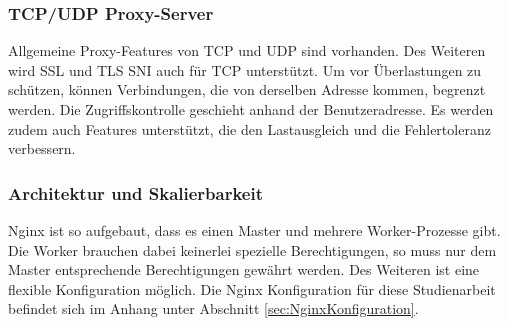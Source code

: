 \subsubsection{TCP/UDP Proxy-Server}
\label{sec:NginxTCP/UDP Proxy-Server}
Allgemeine Proxy-Features von TCP und UDP sind vorhanden. Des Weiteren wird SSL und TLS SNI auch für TCP unterstützt.
Um vor Überlastungen zu schützen, können Verbindungen, die von derselben Adresse kommen, begrenzt werden. Die Zugriffskontrolle geschieht anhand der Benutzeradresse. Es werden zudem auch Features unterstützt, die den Lastausgleich und die Fehlertoleranz verbessern.


\subsubsection{Architektur und Skalierbarkeit}
\label{sec:NginxArchitektur und Skalierbarkeit}
Nginx ist so aufgebaut, dass es einen Master und mehrere Worker-Prozesse gibt. Die Worker brauchen dabei keinerlei spezielle Berechtigungen, so muss nur dem Master entsprechende Berechtigungen gewährt werden. Des Weiteren ist eine flexible Konfiguration möglich. Die Nginx Konfiguration für diese Studienarbeit befindet sich im Anhang unter Abschnitt \ref {sec:NginxKonfiguration}.
